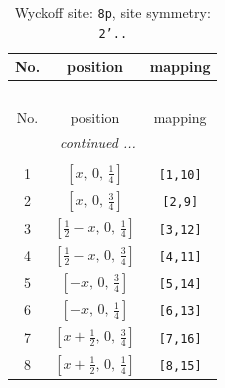 \documentclass[fleqn,8pt]{jsarticle}
\begin{document}
\begin{longtable}{ccc}
\caption{Wyckoff site: {\tt 8p}, site symmetry: {\tt 2'..}}
 \\
 \hline \hline
No. & position & mapping \\ \hline \endfirsthead

\multicolumn{2}{l}{\tablename\ \thetable{}} \\
 \hline \hline
No. & position & mapping \\ \hline \endhead

 \hline \hline
\multicolumn{2}{r}{\footnotesize\it continued ...} \\ \endfoot

 \hline \hline
\multicolumn{2}{r}{} \\ \endlastfoot

1 & $\left[ x,\, 0,\, \frac{1}{4} \right]$ & {\tt [1,10]} \\ \hline
2 & $\left[ x,\, 0,\, \frac{3}{4} \right]$ & {\tt [2,9]} \\ \hline
3 & $\left[ \frac{1}{2} - x,\, 0,\, \frac{1}{4} \right]$ & {\tt [3,12]} \\ \hline
4 & $\left[ \frac{1}{2} - x,\, 0,\, \frac{3}{4} \right]$ & {\tt [4,11]} \\ \hline
5 & $\left[ - x,\, 0,\, \frac{3}{4} \right]$ & {\tt [5,14]} \\ \hline
6 & $\left[ - x,\, 0,\, \frac{1}{4} \right]$ & {\tt [6,13]} \\ \hline
7 & $\left[ x + \frac{1}{2},\, 0,\, \frac{3}{4} \right]$ & {\tt [7,16]} \\ \hline
8 & $\left[ x + \frac{1}{2},\, 0,\, \frac{1}{4} \right]$ & {\tt [8,15]} \\
\end{longtable}
\renewcommand{\arraystretch}{1.2}
\end{document}
